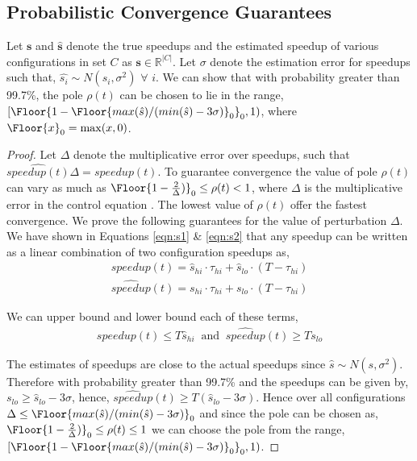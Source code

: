 \subsection*{Probabilistic Convergence Guarantees}


\begin{theorem}
  Let $\mathbf{s}$ and $\hat{\mathbf{s}}$ denote the true speedups and the estimated speedup of various configurations in set $C$ as $\mathbf{s} \in \mathbb{R}^{|C|}$. Let $\sigma$ denote the
  estimation error for speedups such that, $\hat{s_i} \sim
  N(s_i, \sigma^2)$ $\forall$ $i$. We can show that with probability
  greater than 99.7\%, the pole $\rho(t)$ can be chosen to lie in the range, $[\Floor{1- \Floor{max(\hat{s})/(min(\hat{s}) -  3\sigma)}_0}_0, 1)$, where $\Floor{x}_0 = \max(x,0)$.
\end{theorem}

\begin{proof}
Let $\Delta$ denote the multiplicative error over speedups, such that $ \widehat{speedup(t)}\Delta = speedup(t) $. To
guarantee convergence the value of pole $\rho(t)$ can vary as much as
$\Floor{1-\frac{2}{\Delta})}_0\leq \rho(t) < 1$, where $\Delta$ is the
multiplicative error in the control equation \cite{ICSE2014}. The lowest value of $\rho(t)$ offer the fastest convergence. We prove the
following guarantees for the value of perturbation $\Delta$.
  We have shown in Equations \ref{eqn:s1} \& \ref{eqn:s2} that any
  speedup can be written as a linear combination of two configuration
  speedups as,
\begin{align}
speedup(t) = \hat{s}_{hi} \cdot \tau_{hi} + \hat{s}_{lo} \cdot (T - \tau_{hi})
\end{align}
\begin{align}
\widehat{speedup}(t) = s_{hi} \cdot \tau_{hi} + s_{lo} \cdot (T - \tau_{hi})
\end{align}

We can upper bound and lower bound each of these terms,
\begin{align}
speedup(t) \leq T \hat{s}_{hi} \;\; \text{and} \;\; \widehat{speedup}(t) \geq T s_{lo}
\end{align}

The estimates of speedups are close to the actual speedups since
$\hat{s} \sim N(s, \sigma^2)$. Therefore with probability greater
than 99.7\% and the speedups can be given by, $s_{lo} \geq
\hat{s}_{lo} - 3 \sigma$, hence, $\widehat{speedup}(t) \geq T
(\hat{s}_{lo} -3 \sigma)$. Hence over all configurations $\Delta \leq
\Floor{max(\hat{s})/(min(\hat{s}) - 3\sigma)}_0$ and since the pole
can be chosen as, $\Floor{1-\frac{2}{\Delta})}_0\leq \rho(t) \leq 1$ we can choose the pole from the range,  $[\Floor{1-
  \Floor{max(\hat{s})/(min(\hat{s}) - 3\sigma)}_0}_0, 1)$.

\end{proof}
